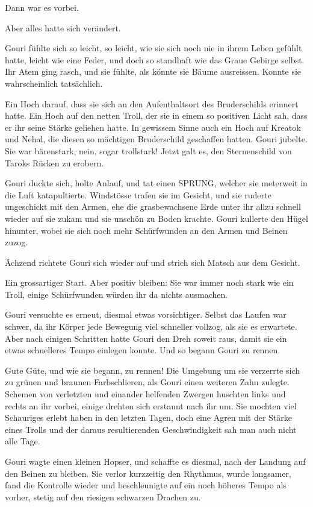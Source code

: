 \documentclass[10pt, a4paper, oneside]{book}
\begin{document}
Dann war es vorbei.

Aber alles hatte sich verändert.

Gouri fühlte sich so leicht, so leicht, wie sie sich noch nie in ihrem Leben gefühlt hatte, leicht wie eine Feder, und doch so standhaft wie das Graue Gebirge selbst. Ihr Atem ging rasch, und sie fühlte, als könnte sie Bäume ausreissen. Konnte sie wahrscheinlich tatsächlich.

Ein Hoch darauf, dass sie sich an den Aufenthaltsort des Bruderschilds erinnert hatte. Ein Hoch auf den netten Troll, der sie in einem so positiven Licht sah, dass er ihr seine Stärke geliehen hatte. In gewissem Sinne auch ein Hoch auf Kreatok und Nehal, die diesen so mächtigen Bruderschild geschaffen hatten. Gouri jubelte. Sie war bärenstark, nein, sogar trollstark! Jetzt galt es, den Sternenschild von Taroks Rücken zu erobern.

Gouri duckte sich, holte Anlauf, und tat einen SPRUNG, welcher sie meterweit in die Luft katapultierte. Windstösse trafen sie im Gesicht, und sie ruderte ungeschickt mit den Armen, ehe die grasbewachsene Erde unter ihr allzu schnell wieder auf sie zukam und sie unschön zu Boden krachte. Gouri kullerte den Hügel hinunter, wobei sie sich noch mehr Schürfwunden an den Armen und Beinen zuzog.

Ächzend richtete Gouri sich wieder auf und strich sich Matsch aus dem Gesicht.

Ein grossartiger Start. Aber positiv bleiben: Sie war immer noch stark wie ein Troll, einige Schürfwunden würden ihr da nichts ausmachen.

Gouri versuchte es erneut, diesmal etwas vorsichtiger. Selbst das Laufen war schwer, da ihr Körper jede Bewegung viel schneller vollzog, als sie es erwartete. Aber nach einigen Schritten hatte Gouri den Dreh soweit raus, damit sie ein etwas schnelleres Tempo einlegen konnte. Und so begann Gouri zu rennen.

Gute Güte, und wie sie begann, zu rennen! Die Umgebung um sie verzerrte sich zu grünen und braunen Farbschlieren, als Gouri einen weiteren Zahn zulegte. Schemen von verletzten und einander helfenden Zwergen huschten links und rechts an ihr vorbei, einige drehten sich erstaunt nach ihr um. Sie mochten viel Schauriges erlebt haben in den letzten Tagen, doch eine Agren mit der Stärke eines Trolls und der daraus resultierenden Geschwindigkeit sah man auch nicht alle Tage.

Gouri wagte einen kleinen Hopser, und schaffte es diesmal, nach der Landung auf den Beinen zu bleiben. Sie verlor kurzzeitig den Rhythmus, wurde langsamer, fand die Kontrolle wieder und beschleunigte auf ein noch höheres Tempo als vorher, stetig auf den riesigen schwarzen Drachen zu.
\end{document}
